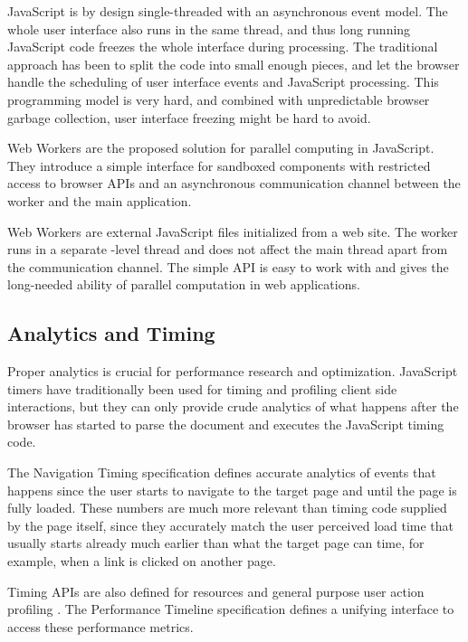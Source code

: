 JavaScript is by design single-threaded with an asynchronous event
model. The whole user interface also runs in the same thread, and thus
long running JavaScript code freezes the whole interface during
processing. The traditional approach has been to split the code into
small enough pieces, and let the browser handle the scheduling of user
interface events and JavaScript processing. This programming model is
very hard, and combined with unpredictable browser garbage collection,
user interface freezing might be hard to avoid. \cite{souders2009even}

Web Workers are the proposed solution for parallel computing in
JavaScript. They introduce a simple interface for sandboxed components
with restricted access to browser APIs and an asynchronous
communication channel between the worker and the main
application. \cite{WebWorkers}

Web Workers are external JavaScript files initialized from a web
site. The worker runs in a separate -level thread and does
not affect the main  thread apart from the communication
channel. The simple API is easy to work with and gives the long-needed
ability of parallel computation in web applications.

\subsection{Analytics and Timing}

Proper analytics is crucial for performance research and
optimization. JavaScript timers have traditionally been used for
timing and profiling client side interactions, but they can only
provide crude analytics of what happens after the browser has started
to parse the document and executes the JavaScript timing code.

The Navigation Timing specification \cite{NavigationTiming} defines
accurate analytics of events that happens since the user starts to
navigate to the target page and until the page is fully loaded. These
numbers are much more relevant than timing code supplied by the page
itself, since they accurately match the user perceived load time that
usually starts already much earlier than what the target page can
time, for example, when a link is clicked on another page.

Timing APIs are also defined for resources \cite{ResourceTiming} and
general purpose user action profiling \cite{UserTiming}. The
Performance Timeline specification \cite{PerformanceTimeline} defines
a unifying interface to access these performance metrics.


